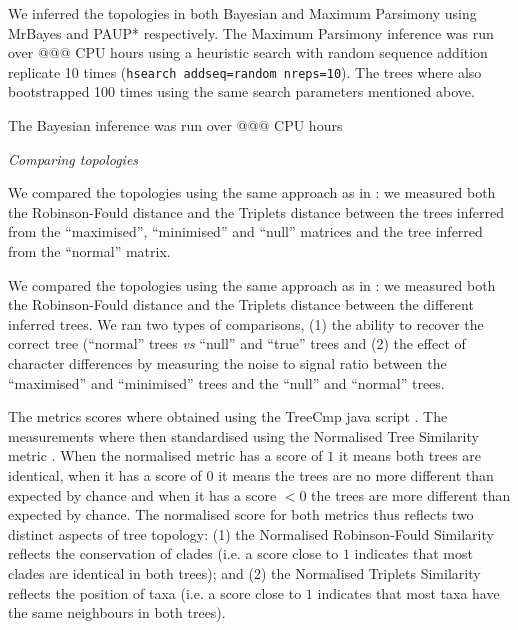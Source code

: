 \documentclass[12pt,letterpaper]{article}
\renewcommand{\subsection}[1]{%
\bigskip
\begin{center}
\begin{large}
\normalfont\itshape #1
\end{large}
\end{center}}
\begin{document}
We inferred the topologies in both Bayesian and Maximum Parsimony using MrBayes \citep[v3.2.6;][]{Ronquist2012mrbayes} and PAUP* \citep[v4.0a151;][]{swofford2001paup} respectively.
The Maximum Parsimony inference was run over @@@ CPU hours using a heuristic search with random sequence addition replicate 10 times (\texttt{hsearch addseq=random nreps=10}).
The trees where also bootstrapped 100 times using the same search parameters mentioned above.

The Bayesian inference was run over @@@ CPU hours



\subsection{Comparing topologies}

We compared the topologies using the same approach as in \cite{Guillerme2016146}: we measured both the Robinson-Fould distance \citep{RF1981} and the Triplets distance \citep{dobson1975triplets} between the trees inferred from the ``maximised'', ``minimised'' and ``null'' matrices and the tree inferred from the ``normal'' matrix.

We compared the topologies using the same approach as in \cite{Guillerme2016146}: we measured both the Robinson-Fould distance \citep{RF1981} and the Triplets distance \citep{dobson1975triplets} between the different inferred trees.
We ran two types of comparisons, (1) the ability to recover the correct tree (``normal'' trees \textit{vs} ``null'' and ``true'' trees and (2) the effect of character differences by measuring the noise to signal ratio between the ``maximised'' and ``minimised'' trees and the ``null'' and ``normal'' trees.

The metrics scores where obtained using the TreeCmp java script \citep{Bogdanowicz2012}.
The measurements where then standardised using the Normalised Tree Similarity metric \citep[i.e. centering the metrics scores using the mean metric score for 1000 pairwise comparisons between random trees with $n$ taxa;][]{Bogdanowicz2012,Guillerme2016146}.
When the normalised metric has a score of $1$ it means both trees are identical, when it has a score of $0$ it means the trees are no more different than expected by chance and when it has a score $<0$ the trees are more different than expected by chance.
The normalised score for both metrics thus reflects two distinct aspects of tree topology: (1) the Normalised Robinson-Fould Similarity reflects the conservation of clades (i.e. a score close to $1$ indicates that most clades are identical in both trees); and (2) the Normalised Triplets Similarity reflects the position of taxa (i.e. a score close to $1$ indicates that most taxa have the same neighbours in both trees).
\end{document}
